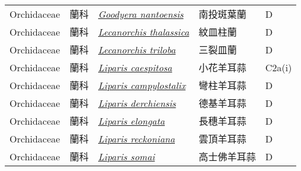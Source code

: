 {\begin{longtable}{L{2.5cm}L{2cm}L{5cm}L{2.5cm}L{3cm}}
    Orchidaceae & 蘭科 & \href{http://www.theplantlist.org/tpl1.1/search?q=Goodyera+nantoensis}{\textit{Goodyera nantoensis} } & 南投斑葉蘭 & D    \\
    Orchidaceae & 蘭科 & \href{http://www.theplantlist.org/tpl1.1/search?q=Lecanorchis+thalassica}{\textit{Lecanorchis thalassica} } & 紋皿柱蘭 & D    \\
    Orchidaceae & 蘭科 & \href{http://www.theplantlist.org/tpl1.1/search?q=Lecanorchis+triloba}{\textit{Lecanorchis triloba} } & 三裂皿蘭 & D    \\
    Orchidaceae & 蘭科 & \href{http://www.theplantlist.org/tpl1.1/search?q=Liparis+caespitosa}{\textit{Liparis caespitosa} } & 小花羊耳蒜 & C2a(i)    \\
    Orchidaceae & 蘭科 & \href{http://www.theplantlist.org/tpl1.1/search?q=Liparis+campylostalix}{\textit{Liparis campylostalix} } & 彎柱羊耳蒜 & D    \\
    Orchidaceae & 蘭科 & \href{http://www.theplantlist.org/tpl1.1/search?q=Liparis+derchiensis}{\textit{Liparis derchiensis} } & 德基羊耳蒜 & D    \\
    Orchidaceae & 蘭科 & \href{http://www.theplantlist.org/tpl1.1/search?q=Liparis+elongata}{\textit{Liparis elongata} } & 長穗羊耳蒜 & D    \\
    Orchidaceae & 蘭科 & \href{http://www.theplantlist.org/tpl1.1/search?q=Liparis+reckoniana}{\textit{Liparis reckoniana} } & 雲頂羊耳蒜 & D    \\
    Orchidaceae & 蘭科 & \href{http://www.theplantlist.org/tpl1.1/search?q=Liparis+somai}{\textit{Liparis somai} } & 高士佛羊耳蒜 & D    \\

\end{longtable}}
